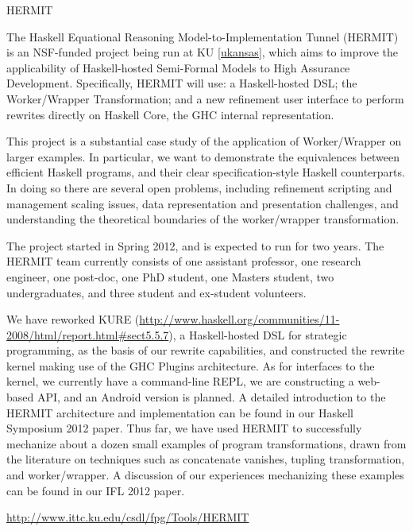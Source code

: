 \begin{hcarentry}[updated]{HERMIT}
\label{HERMIT}
\makeheader

The Haskell Equational Reasoning Model-to-Implementation Tunnel
(HERMIT) is an NSF-funded project being run at KU \cref{ukansas}, which aims to improve the
applicability of Haskell-hosted Semi-Formal Models to High Assurance Development.
Specifically, HERMIT will use: a Haskell-hosted DSL; the Worker/Wrapper Transformation;
and a new refinement user interface to perform rewrites directly on Haskell Core, the GHC internal representation.

This project is a substantial case study of the application of
Worker/Wrapper on larger examples. In particular, we want to
demonstrate the equivalences between efficient Haskell programs, and
their clear specification-style Haskell counterparts. In doing so
there are several open problems, including refinement scripting and
management scaling issues, data representation and presentation
challenges, and understanding the theoretical boundaries of the
worker/wrapper transformation.

The project started in Spring 2012, and is expected to run for two years.
The HERMIT team currently consists of
one assistant professor, %
one research engineer, %
one post-doc, %
one PhD student, %
one Masters student, %
two undergraduates,
and three student and ex-student volunteers. %
%
%

We have reworked KURE (\url{http://www.haskell.org/communities/11-2008/html/report.html#sect5.5.7}), a Haskell-hosted DSL for strategic programming, as the basis of our rewrite capabilities, and constructed the rewrite kernel making use of the GHC Plugins architecture.
As for interfaces to the kernel, we currently have a command-line REPL, we are constructing a web-based API, and an Android version is planned.
A detailed introduction to the HERMIT architecture and implementation can be found in our Haskell Symposium 2012 paper.
Thus far, we have used HERMIT to successfully mechanize about a dozen small examples of program transformations, drawn from the literature on techniques such as concatenate vanishes, tupling transformation, and worker/wrapper.
A discussion of our experiences mechanizing these examples can be found in our IFL 2012 paper.

\FurtherReading
  \url{http://www.ittc.ku.edu/csdl/fpg/Tools/HERMIT}
\end{hcarentry}
